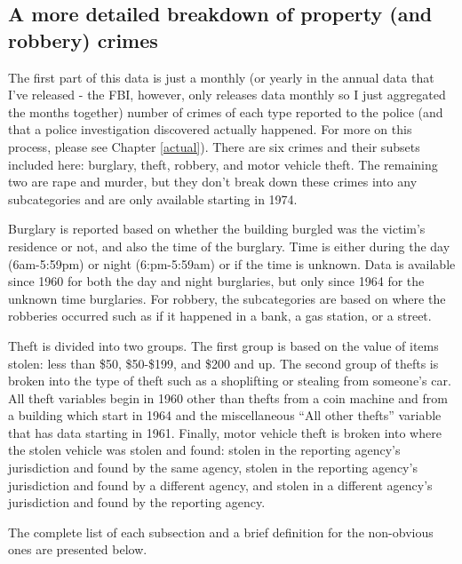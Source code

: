 \documentclass[
  12pt,
  openany]{book}
\begin{document}
\hypertarget{propertycount}{%
\subsection{A more detailed breakdown of property (and robbery) crimes}\label{propertycount}}

The first part of this data is just a monthly (or yearly in the annual data that I've released - the FBI, however, only releases data monthly so I just aggregated the months together) number of crimes of each type reported to the police (and that a police investigation discovered actually happened. For more on this process, please see Chapter \ref{actual}). There are six crimes and their subsets included here: burglary, theft, robbery, and motor vehicle theft. The remaining two are rape and murder, but they don't break down these crimes into any subcategories and are only available starting in 1974.

Burglary is reported based on whether the building burgled was the victim's residence or not, and also the time of the burglary. Time is either during the day (6am-5:59pm) or night (6:pm-5:59am) or if the time is unknown. Data is available since 1960 for both the day and night burglaries, but only since 1964 for the unknown time burglaries. For robbery, the subcategories are based on where the robberies occurred such as if it happened in a bank, a gas station, or a street.

Theft is divided into two groups. The first group is based on the value of items stolen: less than \$50, \$50-\$199, and \$200 and up. The second group of thefts is broken into the type of theft such as a shoplifting or stealing from someone's car. All theft variables begin in 1960 other than thefts from a coin machine and from a building which start in 1964 and the miscellaneous ``All other thefts'' variable that has data starting in 1961. Finally, motor vehicle theft is broken into where the stolen vehicle was stolen and found: stolen in the reporting agency's jurisdiction and found by the same agency, stolen in the reporting agency's jurisdiction and found by a different agency, and stolen in a different agency's jurisdiction and found by the reporting agency.

The complete list of each subsection and a brief definition for the non-obvious ones are presented below.
\end{document}
